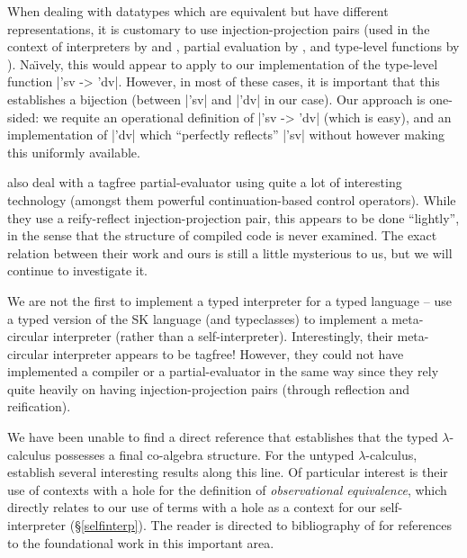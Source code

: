 \documentclass[preprint]{sigplanconf}
\begin{document}
When dealing with datatypes which are equivalent but have different
representations, it is customary to use injection-projection pairs
(used in the context of interpreters by \citet{Ramsey-ML-module-mania}
and \citet{Benton-embedded-interpreters}, partial evaluation by
\citet{Danvy-TDPE}, and type-level functions by
\citet{oliveira-typecase}).  Na\"{\i}vely, this would appear to apply to
our implementation of the type-level function |'sv -> 'dv|.  However, in most
of these cases, it is important that this establishes a bijection (between
|'sv| and |'dv| in our case).  Our approach is one-sided: we requite
an operational definition of |'sv -> 'dv| (which is easy), and an
implementation of |'dv| which ``perfectly reflects'' |'sv| without 
however making this uniformly available.

\citet{fiore:nbe-ppdp2002,balat:tdpe-popl2004} also deal with a 
tagfree partial-evaluator using quite a lot of interesting 
technology (amongst them powerful continuation-based control operators).
While they use a reify-reflect injection-projection pair, this appears
to be done ``lightly'', in the sense that the structure of compiled code
is never examined.  The exact relation between their work and ours is 
still a little mysterious to us, but we will continue to investigate it.

We are not the first to implement a typed interpreter for a typed
language -- \citet{laod93} use a typed version of the SK language
(and typeclasses) to implement a meta-circular interpreter (rather than
a self-interpreter).  Interestingly, their meta-circular interpreter
appears to be tagfree!  However, they could not have implemented a
compiler or a partial-evaluator in the same way since they rely quite
heavily on having injection-projection pairs (through reflection and
reification).  

We have been unable to find a direct reference that establishes that
the typed $\lambda$-calculus possesses a final co-algebra structure.
For the untyped $\lambda$-calculus, 
\citet{HonsellLenisa,honsell99coinductive} establish several interesting
results along this line.  Of particular interest is their use of
contexts with a hole \citep[p.13]{honsell99coinductive} for the definition
of \emph{observational equivalence}, which directly relates to our
use of terms with a hole as a context for our self-interpreter 
(\S\ref{selfinterp}).  The reader is directed to bibliography of
\citet{honsell99coinductive} for references to the foundational work
in this important area.
\end{document}
